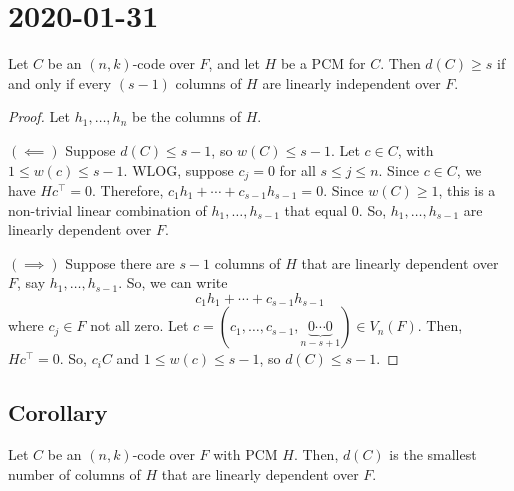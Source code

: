 \section{2020-01-31}
\begin{thmbox}
    \begin{theorem}
    Let $ C $ be an $ (n,k) $-code over $ F $, and let $ H $ be a PCM
    for $ C $. Then $ d(C)\geqslant s $ if and only if every $ (s-1) $ columns
    of $ H $ are linearly independent over $ F $.
\end{theorem} \end{thmbox}

\begin{proof}
    Let $ h_1,\ldots ,h_n $ be the columns of $ H $.

    $ (\impliedby) $ Suppose $ d(C)\leqslant s-1 $, so $ w(C)\leqslant s-1 $.
    Let $ c\in C $, with $ 1\leqslant w(c)\leqslant s-1 $. WLOG, suppose
    $ c_j=0 $ for all $ s\leqslant j\leqslant n $. Since $ c\in C $,
    we have $ Hc^{\top}=0 $. Therefore,
    $ c_1h_1+\cdots+c_{s-1}h_{s-1}=0 $.
    Since $ w(C)\geqslant 1 $, this is a non-trivial linear combination
    of $ h_1,\ldots ,h_{s-1} $ that equal $ 0 $. So,
    $ h_1,\ldots ,h_{s-1} $ are linearly dependent over $ F $.

    $ (\implies) $ Suppose there are $ s-1 $ columns of $ H $ that
    are linearly dependent over $ F $, say $ h_1,\ldots ,h_{s-1} $. So,
    we can write
    \[ c_1h_1+\cdots+c_{s-1}h_{s-1} \]
    where $ c_j\in F $ not all zero. Let $ c=(c_1,\ldots ,c_{s-1},
    \underbrace{0\cdots 0}_{n-s+1})\in V_n(F) $. Then,
    $ Hc^{\top}=0 $. So, $ c_i C $ and $ 1\leqslant w(c)\leqslant s-1 $,
    so $ d(C)\leqslant s-1 $.
\end{proof}

\begin{thmbox}
    \begin{theorem}
    \subsection{Corollary}
    Let $ C $ be an $ (n,k) $-code over $ F $ with PCM $ H $. Then,
    $ d(C) $ is the smallest number of columns of $ H $ that
    are linearly dependent over $ F $.
\end{theorem} \end{thmbox}

